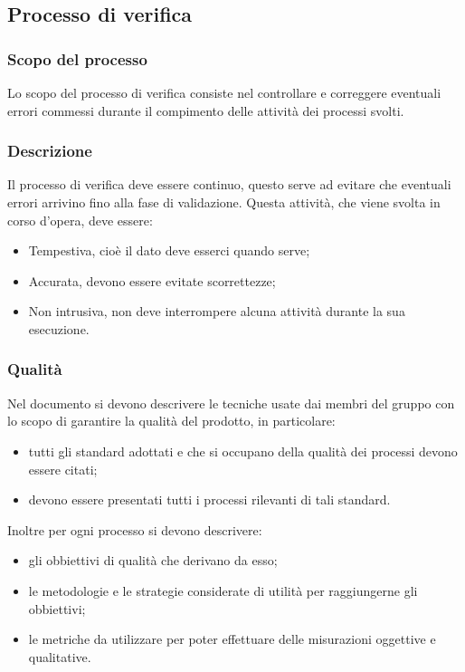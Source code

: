 \subsection{Processo di verifica}
\subsubsection{Scopo del processo}
Lo scopo del processo di verifica consiste nel controllare e correggere eventuali errori commessi durante il compimento delle attività dei processi svolti.
\subsubsection{Descrizione}
Il processo di verifica deve essere continuo, questo serve ad evitare che eventuali errori arrivino fino alla fase di validazione.
Questa attività, che viene svolta in corso d'opera, deve essere:
\begin{itemize}
	\item Tempestiva, cioè il dato deve esserci quando serve;
	\item Accurata, devono essere evitate scorrettezze;
	\item Non intrusiva, non deve interrompere alcuna attività durante la sua esecuzione.
\end{itemize}

	\subsubsection{Qualità}
	Nel documento \PdQ{} si devono descrivere le tecniche usate dai membri del gruppo con lo scopo di garantire la qualità del prodotto, in particolare:
	\begin{itemize}
		\item tutti gli standard adottati e che si occupano della qualità dei processi devono essere citati;
		\item devono essere presentati tutti i processi rilevanti di tali standard.
	\end{itemize}
	Inoltre per ogni processo si devono descrivere:
	\begin{itemize}
		\item gli obbiettivi di qualità che derivano da esso;
		\item le metodologie e le strategie considerate di utilità per raggiungerne gli obbiettivi;
		\item le metriche da utilizzare per poter effettuare delle misurazioni oggettive e qualitative.
	\end{itemize}

